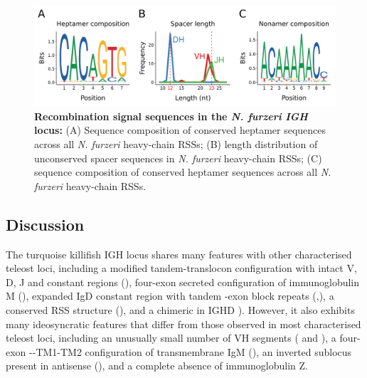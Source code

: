 	\begin{figure}
	\includegraphics[width=\textwidth]{_Figures/png/nfu-rss-seqlogo-all}
	\caption[Recombination signal sequences in the \textit{N. furzeri} \textit{IGH} locus]{\textbf{Recombination signal sequences in the \textit{N. furzeri} \textit{IGH} locus:} (A) Sequence composition of conserved heptamer sequences across all \textit{N. furzeri} heavy-chain RSSs; (B) length distribution of unconserved spacer sequences in \textit{N. furzeri} heavy-chain RSSs; (C) sequence composition of conserved heptamer sequences across all \textit{N. furzeri} heavy-chain RSSs.}
	\label{fig:nfu-rss-seqlogo-all}
	\end{figure} %
	
	



	
	\subsection{Discussion}
	
	The turquoise killifish IGH locus shares many features with other characterised teleost loci, including a modified tandem-translocon configuration with intact V, D, J and constant regions (), four-exon secreted configuration of immunoglobulin M (), expanded IgD constant region with tandem \cd{}-exon block repeats (,), a conserved RSS structure (), and a chimeric  in IGHD ). However, it also exhibits many ideosyncratic features that differ from those observed in most characterised teleost loci, including an unusually small number of VH segments ( and ), a four-exon --TM1-TM2 configuration of transmembrane IgM (), an inverted sublocus present in antisense (), and a complete absence of immunoglobulin Z.
	
